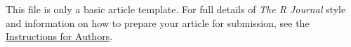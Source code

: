 This file is only a basic article template. For full details of \emph{The R Journal} style and information on how to prepare your article for submission, see the \href{https://journal.r-project.org/share/author-guide.pdf}{Instructions for Authors}.



\address{Author One\\
  Affiliation\\
  Address\\
  Country\\
  (ORCiD if desired)\\
  }

\address{Author Two\\
  Affiliation\\
  Address\\
  Country\\
  (ORCiD if desired)\\
  }

\address{Author Three\\
  Affiliation\\
  Address\\
  Country\\
  (ORCiD if desired)\\
  }
